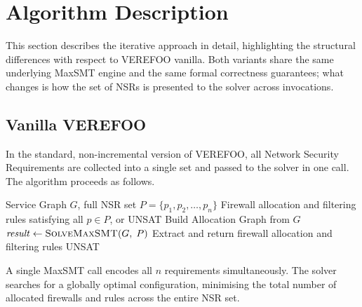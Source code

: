 

%


\section{Algorithm Description}

This section describes the iterative approach in detail, highlighting the structural differences with respect to VEREFOO vanilla. Both variants share the same underlying MaxSMT engine and the same formal correctness guarantees; what changes is how the set of NSRs is presented to the solver across invocations.

\subsection{Vanilla VEREFOO}

In the standard, non-incremental version of VEREFOO, all Network Security Requirements are collected into a single set and passed to the solver in one call. The algorithm proceeds as follows.

\begin{algorithm}[H]
\caption{Vanilla VEREFOO}
\label{alg:vanilla}
\begin{algorithmic}[1]
\Require Service Graph $G$, full NSR set $P = \{p_1, p_2, \ldots, p_n\}$
\Ensure Firewall allocation and filtering rules satisfying all $p \in P$, or UNSAT
\State Build Allocation Graph from $G$
\State $\mathit{result} \gets \textsc{SolveMaxSMT}(G,\; P)$
    \State Extract and return firewall allocation and filtering rules
\Else
    \State \Return UNSAT
\EndIf
\end{algorithmic}
\end{algorithm}

A single MaxSMT call encodes all $n$ requirements simultaneously. The solver searches for a globally optimal configuration, minimising the total number of allocated firewalls and rules across the entire NSR set.


